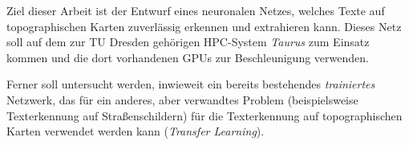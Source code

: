Ziel dieser Arbeit ist der Entwurf eines neuronalen Netzes, welches Texte auf topographischen Karten zuverlässig
erkennen und extrahieren kann. Dieses Netz soll auf dem zur TU Dresden gehörigen HPC-System \textit{Taurus} zum Einsatz
kommen und die dort vorhandenen GPUs zur Beschleunigung verwenden.

Ferner soll untersucht werden, inwieweit ein bereits bestehendes \textit{trainiertes} Netzwerk, das für ein
anderes, aber verwandtes Problem (beispielsweise Texterkennung auf Straßenschildern) für die Texterkennung auf
topographischen Karten verwendet werden kann (\textit{Transfer Learning}).
